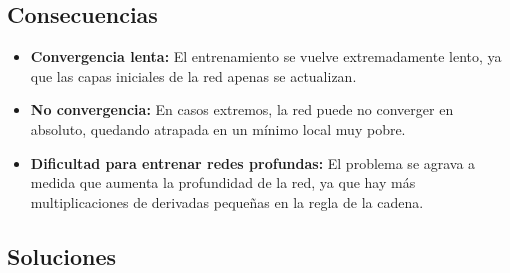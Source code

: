 \documentclass{article}
\begin{document}
\subsection{Consecuencias}
\begin{itemize}
    \item \textbf{Convergencia lenta:} El entrenamiento se vuelve extremadamente lento, ya que las capas iniciales de la red apenas se actualizan.
    \item \textbf{No convergencia:} En casos extremos, la red puede no converger en absoluto, quedando atrapada en un mínimo local muy pobre.
    \item \textbf{Dificultad para entrenar redes profundas:} El problema se agrava a medida que aumenta la profundidad de la red, ya que hay más multiplicaciones de derivadas pequeñas en la regla de la cadena.
\end{itemize}

\subsection{Soluciones}
\end{document}
